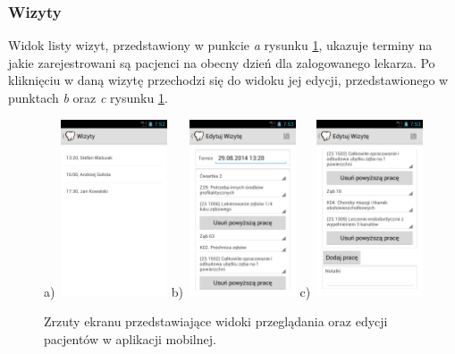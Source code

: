 \documentclass[11pt]{aghdpl}
\begin{document}
\subsubsection{Wizyty}
\label{sec:wizytyMobile}

Widok listy wizyt, przedstawiony w punkcie \emph{a} rysunku \ref{fig:wizytyMobile}, ukazuje terminy na jakie zarejestrowani są pacjenci na obecny dzień dla zalogowanego lekarza. Po kliknięciu w daną wizytę przechodzi się do widoku jej edycji, przedstawionego w punktach \emph{b} oraz \emph{c} rysunku \ref{fig:wizytyMobile}.

\begin{figure}[h!]
	\begin{center}
		a)~\includegraphics[width=0.28\textwidth]{wizytyMobile}
		\hspace{5mm}
		b)~\includegraphics[width=0.28\textwidth]{wizyta1Mobile}
		\hspace{5mm}
		c)~\includegraphics[width=0.28\textwidth]{wizyta2Mobile}
	\end{center}
	\caption{Zrzuty ekranu przedstawiające widoki przeglądania oraz edycji pacjentów w aplikacji mobilnej.}
	\label{fig:wizytyMobile}
\end{figure}
\end{document}
